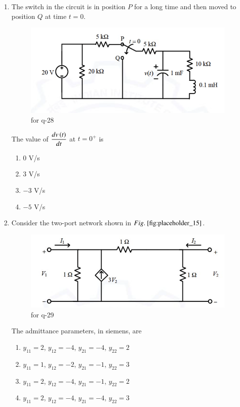 \documentclass[journal,12pt,onecolumn]{IEEEtran}
\theoremstyle{remark}
\begin{document}
\begin{enumerate}
\item The switch in the circuit is in position $P$ for a long time and then moved to position $Q$ at time $t = 0$.  
\begin{figure}[H]
    \centering
    \includegraphics[width=0.4\columnwidth]{figs/14.png}
    \caption{\centering for q-28}
    \label{fig:placeholder_14}
\end{figure}
The value of $\dfrac{dv\left(t\right)}{dt}$ at $t = 0^+$ is
\begin{multicols}{4}
\begin{enumerate}
\item $0$ V/s
\item $3$ V/s
\item $-3$ V/s
\item $-5$ V/s
\end{enumerate}
\end{multicols}
\hfill {}

\item Consider the two-port network shown in $\figref{fig:placeholder_15}$.  
\begin{figure}[H]
    \centering
    \includegraphics[width=0.4\columnwidth]{figs/15.png}
    \caption{\centering for q-29}
    \label{fig:placeholder_15}
\end{figure}
The admittance parameters, in siemens, are
\begin{multicols}{2}
\begin{enumerate}
\item $y_{11} = 2$, $y_{12} = -4$, $y_{21} = -4$, $y_{22} = 2$
\item $y_{11} = 1$, $y_{12} = -2$, $y_{21} = -1$, $y_{22} = 3$
\item $y_{11} = 2$, $y_{12} = -4$, $y_{21} = -1$, $y_{22} = 2$
\item $y_{11} = 2$, $y_{12} = -4$, $y_{21} = -4$, $y_{22} = 3$
\end{enumerate}
\end{multicols}
\hfill {}


\end{enumerate}
\end{document}
